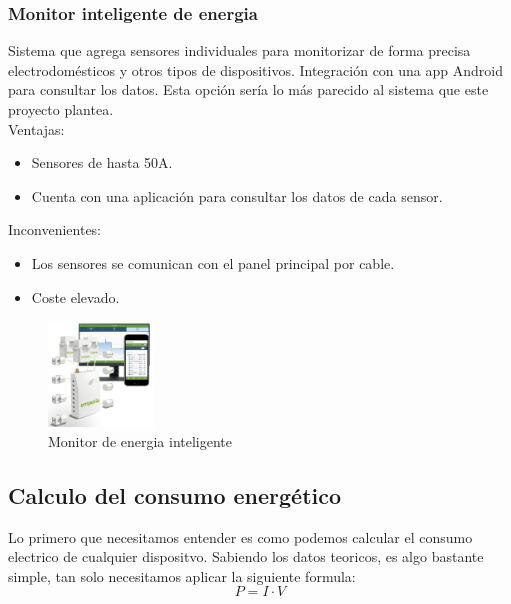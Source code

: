 \begin{titlepage}
\subsubsection{Monitor inteligente de energia}
Sistema que agrega sensores individuales para monitorizar de forma precisa electrodomésticos y otros tipos de dispositivos. Integración con una app Android para consultar los datos. Esta opción sería lo más parecido al sistema que este proyecto plantea.\\

Ventajas:
\begin{itemize}
	\item Sensores de hasta 50A.
	\item Cuenta con una aplicación para consultar los datos de cada sensor.
\end{itemize}

Inconvenientes:
\begin{itemize}
	\item Los sensores se comunican con el panel principal por cable.
	\item Coste elevado.
\end{itemize}
\begin{figure}[h!]
	\centering
	\includegraphics[width=0.25\textwidth]{imagenes/monitor_consumo.jpg}
	\caption{Monitor de energia inteligente\cite{monitor_inteligente_img}}
\end{figure}

\newpage

\subsection{Calculo del consumo energético}
Lo primero que necesitamos entender es como podemos calcular el consumo electrico de cualquier dispositvo. Sabiendo los datos teoricos, es algo bastante simple, tan solo necesitamos aplicar la siguiente formula: \\
\begin{equation}
\label{eq:consumo}
P = I \cdot V
\end{equation}


\end{titlepage}
